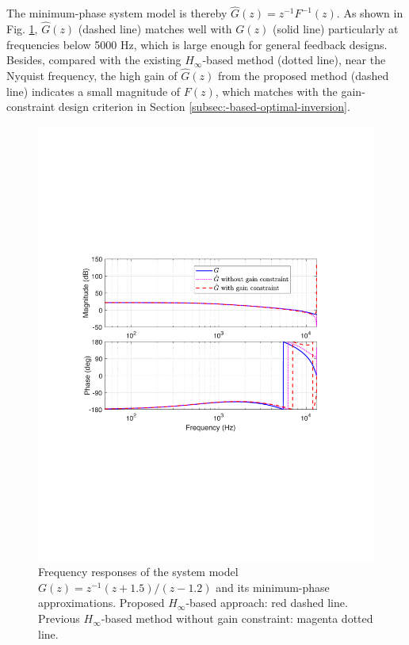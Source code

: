 \documentclass [11pt, proquest] {uwthesis}[2020/02/24]
\begin{document}
The minimum-phase system model is thereby $\hat{G}(z)=z^{-1}F^{-1}(z)$.
As shown in Fig. \ref{fig:Optimal-inverse-design}, $\hat{G}(z)$
(dashed line) matches well with $G(z)$ (solid line) particularly
at frequencies below 5000 Hz, which is large enough for general feedback
designs. Besides, compared with the existing $H_{\infty}$-based
method (dotted line), near the Nyquist frequency, the high gain of
$\hat{G}(z)$ from the proposed method (dashed line) indicates a small
magnitude of $F(z)$, which matches with the gain-constraint design
criterion in Section \ref{subsec:-based-optimal-inversion}.
\begin{figure}[!ht]
\begin{centering}
\includegraphics[width=12cm]{Model-inversion/unstable_plant}
\par\end{centering}
\caption{\label{fig:Optimal-inverse-design}Frequency responses of the system
model $G(z)=z^{-1}(z+1.5)/(z-1.2)$ and its minimum-phase approximations.
Proposed $H_{\infty}$-based approach: red dashed line. Previous $H_{\infty}$-based
method without gain constraint: magenta dotted line. }
\end{figure}
\end{document}
